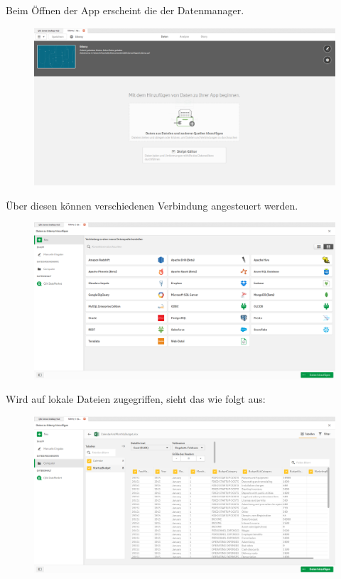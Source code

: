 Beim Öffnen der App erscheint die der Datenmanager.

\begin{figure}[H]
	\centering
	\includegraphics[scale = 0.3]{attachment/chapter_3/Scc012}
	\caption{}
	\label{fig:Scc012}
\end{figure}
Über diesen können verschiedenen Verbindung angesteuert werden.

\begin{figure}[H]
	\centering
	\includegraphics[scale = 0.3]{attachment/chapter_3/Scc013}
	\caption{}
	\label{fig:Scc013}
\end{figure}
Wird auf lokale Dateien zugegriffen, sieht das wie folgt aus:

\begin{figure}[H]
	\centering
	\includegraphics[scale = 0.3]{attachment/chapter_3/Scc014}
	\caption{}
	\label{fig:Scc014}
\end{figure}

